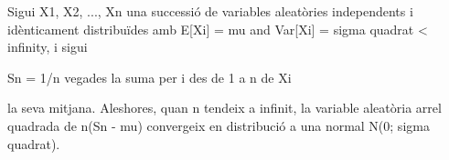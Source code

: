 \documentclass{article}
\begin{document}

Sigui X1, X2, ..., Xn una successió de variables aleatòries 
independents i idènticament distribuïdes amb
E[Xi] = mu and Var[Xi] = sigma quadrat < infinity, 
i sigui

Sn = 1/n vegades la suma per i des de 1 a n de Xi

la seva mitjana. Aleshores, quan  n tendeix a infinit, la 
variable aleatòria arrel quadrada de n(Sn - mu) convergeix en
distribució a una normal N(0; sigma quadrat).
\end{document}
